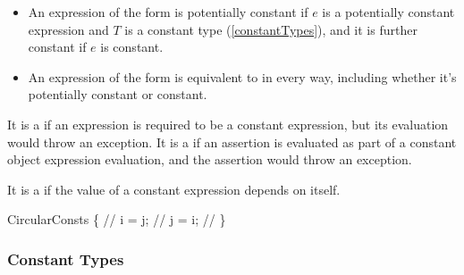 \documentclass[makeidx]{article}
\begin{document}
{\begin{itemize}
  if $e$ is a potentially constant expression
  and $T$ is a potentially constant type
  (\ref{constantTypes}),
  and it is further constant if $e$ is constant.
\item
  An expression of the form  is potentially constant
  if $e$ is a potentially constant expression
  and $T$ is a constant type
  (\ref{constantTypes}),
  and it is further constant if $e$ is constant.
\item
  An expression of the form 
  is equivalent to  in every way,
  including whether it's potentially constant or constant.
\end{itemize}



\LMHash{}%
It is a  if an expression is required to be
a constant expression,
but its evaluation would throw an exception.
It is a  if an assertion is evaluated as part of
a constant object expression evaluation,
and the assertion would throw an exception.

\LMHash{}%
It is a  if the value of a constant expression
depends on itself.


\begin{dartCode}
\CLASS{} CircularConsts \{
  // 
  \STATIC{} \CONST{} i = j; // 
  \STATIC{} \CONST{} j = i; // 
\}
\end{dartCode}


\subsubsection{Constant Types}

}
\end{document}
